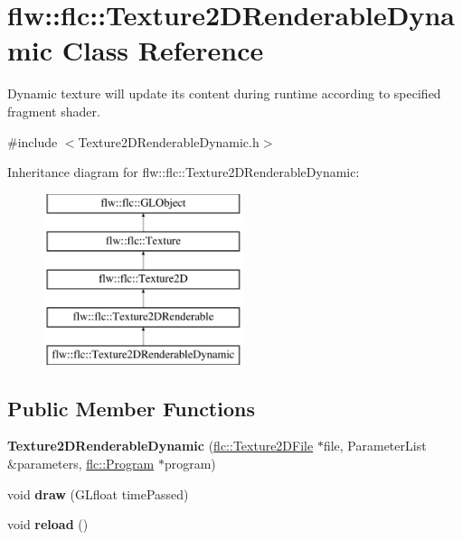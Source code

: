 \hypertarget{classflw_1_1flc_1_1Texture2DRenderableDynamic}{}\section{flw\+:\+:flc\+:\+:Texture2\+D\+Renderable\+Dynamic Class Reference}
\label{classflw_1_1flc_1_1Texture2DRenderableDynamic}


Dynamic texture will update its content during runtime according to specified fragment shader.  




{\ttfamily \#include $<$Texture2\+D\+Renderable\+Dynamic.\+h$>$}

Inheritance diagram for flw\+:\+:flc\+:\+:Texture2\+D\+Renderable\+Dynamic\+:\begin{figure}[H]
\begin{center}
\leavevmode
\includegraphics[height=5.000000cm]{classflw_1_1flc_1_1Texture2DRenderableDynamic}
\end{center}
\end{figure}
\subsection*{Public Member Functions}
\begin{DoxyCompactItemize}
\item 
{\bfseries Texture2\+D\+Renderable\+Dynamic} (\hyperlink{classflw_1_1flc_1_1Texture2DFile}{flc\+::\+Texture2\+D\+File} $\ast$file, Parameter\+List \&parameters, \hyperlink{classflw_1_1flc_1_1Program}{flc\+::\+Program} $\ast$program)\hypertarget{classflw_1_1flc_1_1Texture2DRenderableDynamic_a5d3a317f239d2b1bee20de6c6ec09d39}{}\label{classflw_1_1flc_1_1Texture2DRenderableDynamic_a5d3a317f239d2b1bee20de6c6ec09d39}

\item 
void {\bfseries draw} (G\+Lfloat time\+Passed)\hypertarget{classflw_1_1flc_1_1Texture2DRenderableDynamic_a7b8c3b852997084d8caf4b96b107d5b4}{}\label{classflw_1_1flc_1_1Texture2DRenderableDynamic_a7b8c3b852997084d8caf4b96b107d5b4}

\item 
void {\bfseries reload} ()\hypertarget{classflw_1_1flc_1_1Texture2DRenderableDynamic_a5339d5ac11f692049605504e3e6c4cc4}{}\label{classflw_1_1flc_1_1Texture2DRenderableDynamic_a5339d5ac11f692049605504e3e6c4cc4}

\end{DoxyCompactItemize}
